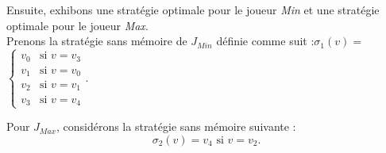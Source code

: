 \begin{exemple}
Ensuite, exhibons une stratégie optimale pour le joueur \textit{Min} et une stratégie optimale pour le joueur \textit{Max}.\\

\noindent Prenons la stratégie sans mémoire de $J_{Min}$ définie comme suit :\linebreak $\sigma _{1}(v) = $ $\begin{cases}
																						v_{0} & \text{si }v = v_{3}\\
																						v_{1} & \text{si }v = v_{0}\\
																						v_{2} & \text{si }v = v_{1}\\
																						v_{3} & \text{si }v = v_{4}
																					\end{cases}.$

\noindent Pour $J_{Max}$, considérons la stratégie sans mémoire suivante :$$\sigma _{2}(v) = v_{4}  \text{ si } v = v_{2}.$$\\
																																										
						
\end{exemple}